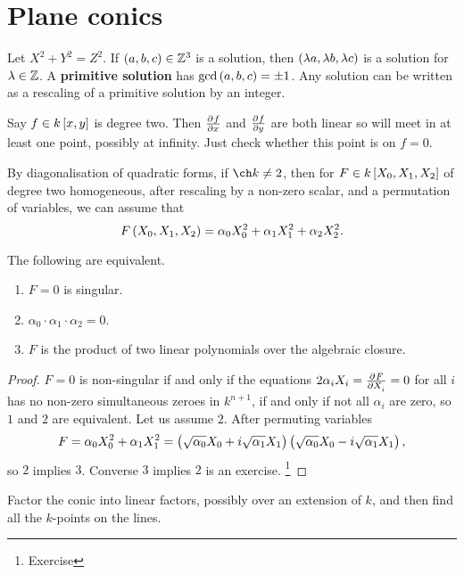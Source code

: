 \pagebreak

\section{Plane conics}

Let $ X^2 + Y^2 = Z^2 $. If $ \br{a, b, c} \in \ZZ^3 $ is a solution, then $ \br{\lambda a, \lambda b, \lambda c} $ is a solution for $ \lambda \in \mathbb{Z} $. A \textbf{primitive solution} has $ \gcd\br{a, b, c} = \pm 1 $. Any solution can be written as a rescaling of a primitive solution by an integer.

\begin{algorithm}
Say $ f \in k\sbr{x, y} $ is degree two. Then $ \tpd{f}{x} $ and $ \tpd{f}{y} $ are both linear so will meet in at least one point, possibly at infinity. Just check whether this point is on $ f = 0 $.
\end{algorithm}

By diagonalisation of quadratic forms, if $ \ch k \ne 2 $, then for $ F \in k\sbr{X_0, X_1, X_2} $ of degree two homogeneous, after rescaling by a non-zero scalar, and a permutation of variables, we can assume that
$$ F\br{X_0, X_1, X_2} = \alpha_0X_0^2 + \alpha_1X_1^2 + \alpha_2X_2^2. $$

\begin{theorem}
The following are equivalent.
\begin{enumerate}
\item $ F = 0 $ is singular.
\item $ \alpha_0 \cdot \alpha_1 \cdot \alpha_2 = 0 $.
\item $ F $ is the product of two linear polynomials over the algebraic closure.
\end{enumerate}
\end{theorem}

\begin{proof}
$ F = 0 $ is non-singular if and only if the equations $ 2\alpha_iX_i = \tpd{F}{X_i} = 0 $ for all $ i $ has no non-zero simultaneous zeroes in $ k^{n + 1} $, if and only if not all $ \alpha_i $ are zero, so $ 1 $ and $ 2 $ are equivalent. Let us assume $ 2 $. After permuting variables
$$ F = \alpha_0X_0^2 + \alpha_1X_1^2 = \br{\sqrt{\alpha_0}X_0 + i\sqrt{\alpha_1}X_1}\br{\sqrt{\alpha_0}X_0 - i\sqrt{\alpha_1}X_1}, $$
so $ 2 $ implies $ 3 $. Converse $ 3 $ implies $ 2 $ is an exercise. \footnote{Exercise}
\end{proof}

\begin{algorithm}
Factor the conic into linear factors, possibly over an extension of $ k $, and then find all the $ k $-points on the lines.
\end{algorithm}

